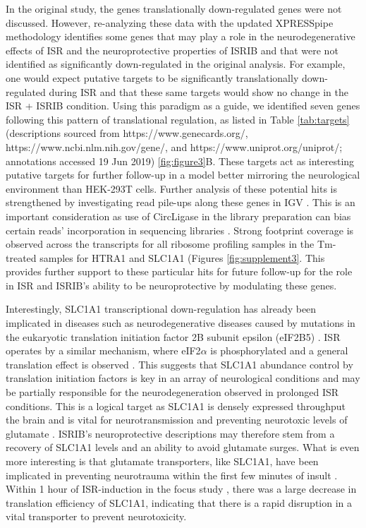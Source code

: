 \documentclass[11pt, a4paper, oneside]{article}
\begin{document}
In the original study, the genes translationally down-regulated genes were not discussed. However, re-analyzing these data with the updated XPRESSpipe methodology identifies some genes that may play a role in the neurodegenerative effects of ISR and the neuroprotective properties of ISRIB and that were not identified as significantly down-regulated in the original analysis. For example, one would expect putative targets to be significantly translationally down-regulated during ISR and that these same targets would show no change in the ISR + ISRIB condition. Using this paradigm as a guide, we identified seven genes following this pattern of translational regulation, as listed in Table \ref{tab:targets} (descriptions sourced from https://www.genecards.org/, https://www.ncbi.nlm.nih.gov/gene/, and https://www.uniprot.org/uniprot/; annotations accessed 19 Jun 2019) \ref{fig:figure3}B. These targets act as interesting putative targets for further follow-up in a model better mirroring the neurological environment than HEK-293T cells. Further analysis of these potential hits is strengthened by investigating read pile-ups along these genes in IGV \cite{igv}. This is an important consideration as use of CircLigase in the library preparation can bias certain reads' incorporation in sequencing libraries \cite{circligase_bias}. Strong footprint coverage is observed across the transcripts for all ribosome profiling samples in the Tm-treated samples for HTRA1 and SLC1A1 (Figures \ref{fig:supplement3}. This provides further support to these particular hits for future follow-up for the role in ISR and ISRIB's ability to be neuroprotective by modulating these genes.

Interestingly, SLC1A1 transcriptional down-regulation has already been implicated in diseases such as neurodegenerative diseases caused by mutations in the eukaryotic translation initiation factor 2B subunit epsilon (eIF2B5) \cite{eif2b_neuroprotective}. ISR operates by a similar mechanism, where eIF2$\alpha$ is phosphorylated and a general translation effect is observed \cite{isrib_riboseq, isrib_structure}. This suggests that SLC1A1 abundance control by translation initiation factors is key in an array of neurological conditions and may be partially responsible for the neurodegeneration observed in prolonged ISR conditions. This is a logical target as SLC1A1 is densely expressed throughput the brain and is vital for neurotransmission and preventing neurotoxic levels of glutamate \cite{slc1a1_neurotoxic}. ISRIB's neuroprotective descriptions may therefore stem from a recovery of SLC1A1 levels and an ability to avoid glutamate surges. What is even more interesting is that glutamate transporters, like SLC1A1, have been implicated in preventing neurotrauma within the first few minutes of insult \cite{slc1a1_neurotoxic}. Within 1 hour of ISR-induction in the focus study \cite{isrib_riboseq}, there was a large decrease in translation efficiency of SLC1A1, indicating that there is a rapid disruption in a vital transporter to prevent neurotoxicity.
\end{document}
